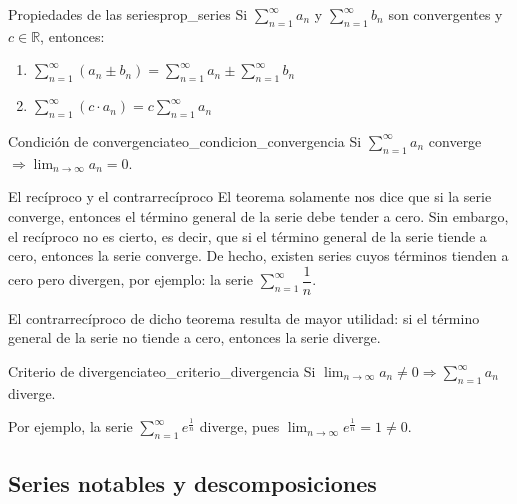 \begin{proposition}{Propiedades de las series}{prop_series}
    Si $\displaystyle\sum_{n=1}^{\infty}a_n$ y $\displaystyle\sum_{n=1}^{\infty}b_n$ son convergentes y $c \in \mathbb{R}$, entonces:
    \begin{enumerate}
        \item $\displaystyle\sum_{n=1}^{\infty}(a_n \pm b_n) = \sum_{n=1}^{\infty}a_n \pm \sum_{n=1}^{\infty}b_n$
        \item $\displaystyle\sum_{n=1}^{\infty}(c \cdot a_n) = c\sum_{n=1}^{\infty}a_n$
    \end{enumerate}
\end{proposition}

\begin{theorem}{Condición de convergencia}{teo_condicion_convergencia}
    Si $\displaystyle\sum_{n=1}^{\infty}a_n$ converge $\Longrightarrow \displaystyle \lim_{n\to\infty}a_n = 0$.
\end{theorem}

\begin{remark}{El recíproco y el contrarrecíproco}{}
    El teorema solamente nos dice que si la serie converge, entonces el término general de la serie debe tender a cero. Sin embargo, el recíproco no es cierto, es decir, que si el término general de la serie tiende a cero, entonces la serie converge. De hecho, existen series cuyos términos tienden a cero pero divergen, por ejemplo: la serie $\displaystyle \sum_{n=1}^{\infty}{\dfrac{1}{n}}$.
    
    El contrarrecíproco de dicho teorema resulta de mayor utilidad: si el término general de la serie no tiende a cero, entonces la serie diverge.
\end{remark}

\begin{theorem}{Criterio de divergencia}{teo_criterio_divergencia}
    Si $\displaystyle\lim_{n\to\infty}a_n \neq 0 \Longrightarrow \sum_{n=1}^{\infty}a_n$ diverge.
\end{theorem}

Por ejemplo, la serie $\displaystyle\sum_{n=1}^{\infty}e^{\frac{1}{n}}$ diverge, pues $\displaystyle\lim_{n\to\infty}e^{\frac{1}{n}} = 1 \neq 0$.

\subsection{Series notables y descomposiciones}


